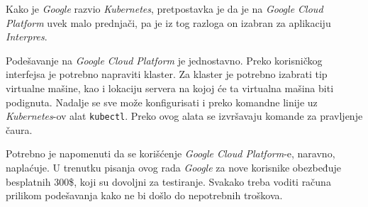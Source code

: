 Kako je \textit{Google} razvio \textit{Kubernetes}, pretpostavka je da je 
na \textit{Google Cloud Platform} uvek malo prednjači, pa je iz tog razloga 
on izabran za aplikaciju \textit{Interpres}.

Podešavanje na \textit{Google Cloud Platform} je jednostavno. Preko 
korisničkog interfejsa je potrebno napraviti klaster. Za klaster je 
potrebno izabrati tip virtualne mašine, kao i lokaciju servera na kojoj 
će ta virtualna mašina biti podignuta. Nadalje se sve može konfigurisati 
i preko komandne linije uz \textit{Kubernetes}-ov alat \texttt{kubectl}.
Preko ovog alata se izvršavaju komande za pravljenje čaura.

Potrebno je napomenuti da se korišćenje \textit{Google Cloud Platform}-e,
naravno, naplaćuje. U trenutku pisanja ovog rada \textit{Google} za nove 
korisnike obezbeđuje besplatnih 300\$, koji su dovoljni za testiranje.
Svakako treba voditi računa prilikom podešavanja kako ne bi došlo do 
nepotrebnih troškova.

